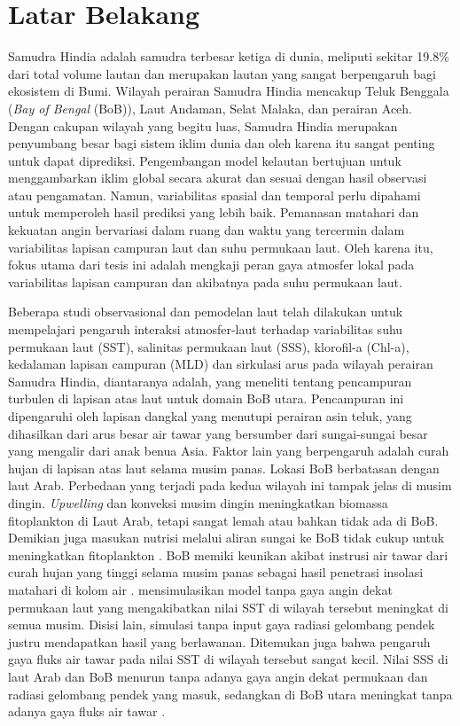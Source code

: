 \vspace{1.5pc}
\section[Latar Belakang]{Latar Belakang}
\begin{spacing}{1.5}
	Samudra Hindia adalah samudra terbesar ketiga di dunia, meliputi sekitar 19.8\% dari total volume lautan  dan merupakan lautan yang sangat berpengaruh bagi ekosistem di Bumi. Wilayah perairan Samudra Hindia mencakup Teluk Benggala (\textit{Bay of Bengal} (BoB)), Laut Andaman, Selat Malaka, dan perairan Aceh. Dengan cakupan wilayah yang begitu luas, Samudra Hindia merupakan penyumbang besar bagi sistem iklim dunia dan oleh karena itu sangat penting untuk dapat diprediksi. Pengembangan model kelautan bertujuan untuk menggambarkan iklim global secara akurat dan sesuai dengan hasil observasi atau pengamatan. Namun, variabilitas spasial dan temporal perlu dipahami untuk memperoleh hasil prediksi yang lebih baik. Pemanasan matahari dan kekuatan angin bervariasi dalam ruang dan waktu yang tercermin dalam variabilitas lapisan campuran laut dan suhu permukaan laut. Oleh karena itu, fokus utama dari tesis ini adalah mengkaji peran gaya atmosfer lokal pada variabilitas lapisan campuran dan akibatnya pada suhu permukaan laut.
	
	Beberapa studi observasional dan pemodelan laut telah dilakukan untuk mempelajari pengaruh interaksi atmosfer-laut terhadap variabilitas suhu permukaan laut (SST), salinitas permukaan laut (SSS), klorofil-a (Chl-a), kedalaman lapisan campuran (MLD) dan sirkulasi arus pada wilayah perairan Samudra Hindia, diantaranya adalah,  yang meneliti tentang pencampuran turbulen di lapisan atas laut untuk domain BoB utara. Pencampuran ini dipengaruhi oleh lapisan dangkal yang menutupi perairan asin teluk, yang dihasilkan dari arus besar air tawar yang bersumber dari sungai-sungai besar yang mengalir dari anak benua Asia. Faktor lain yang berpengaruh adalah curah hujan di lapisan atas laut selama musim panas. Lokasi BoB berbatasan dengan laut Arab. Perbedaan yang terjadi pada kedua wilayah ini tampak jelas di musim dingin. \textit{Upwelling} dan konveksi musim dingin meningkatkan biomassa fitoplankton di Laut Arab, tetapi sangat lemah atau bahkan tidak ada di BoB. Demikian juga masukan nutrisi melalui aliran sungai ke BoB tidak cukup untuk meningkatkan fitoplankton . BoB memiki keunikan akibat instrusi air tawar dari curah hujan yang tinggi selama musim panas sebagai hasil penetrasi insolasi matahari di kolom air \cite{Kantha2019}.  mensimulasikan model tanpa gaya angin dekat permukaan laut yang mengakibatkan nilai SST di wilayah tersebut meningkat di semua musim. Disisi lain, simulasi tanpa input gaya radiasi gelombang pendek justru mendapatkan hasil yang berlawanan. Ditemukan juga bahwa pengaruh gaya fluks air tawar pada nilai SST di wilayah tersebut sangat kecil. Nilai SSS di laut Arab dan BoB menurun tanpa adanya gaya angin dekat permukaan dan radiasi gelombang pendek yang masuk, sedangkan di BoB utara meningkat tanpa adanya gaya fluks air tawar .
	

\end{spacing}
